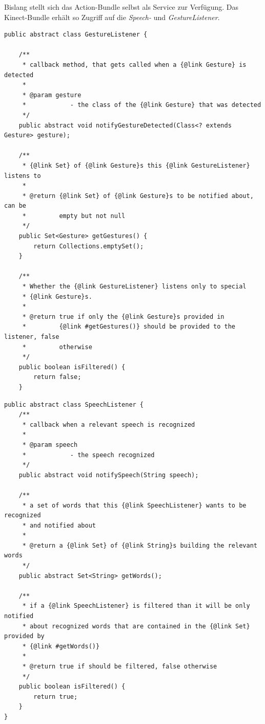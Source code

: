 Bislang stellt sich das Action-Bundle selbst als Service zur Verf\"ugung. Das Kinect-Bundle erh\"alt so Zugriff auf die \textit{Speech-} und 
\textit{GestureListener}.


\par\smallskip
\lstset{language=Java}
\begin{lstlisting}[caption={Klasse GestureListener}, label={listing:GestureListener}]
public abstract class GestureListener {

	/**
	 * callback method, that gets called when a {@link Gesture} is detected
	 * 
	 * @param gesture
	 *            - the class of the {@link Gesture} that was detected
	 */
	public abstract void notifyGestureDetected(Class<? extends Gesture> gesture);

	/**
	 * {@link Set} of {@link Gesture}s this {@link GestureListener} listens to
	 * 
	 * @return {@link Set} of {@link Gesture}s to be notified about, can be
	 *         empty but not null
	 */
	public Set<Gesture> getGestures() {
		return Collections.emptySet();
	}

	/**
	 * Whether the {@link GestureListener} listens only to special
	 * {@link Gesture}s.
	 * 
	 * @return true if only the {@link Gesture}s provided in
	 *         {@link #getGestures()} should be provided to the listener, false
	 *         otherwise
	 */
	public boolean isFiltered() {
		return false;
	}
\end{lstlisting}
\par\smallskip

\par\smallskip
\lstset{language=Java}
\begin{lstlisting}[caption={Klasse SpeechListener}, label={listing:SpeechListener}]
public abstract class SpeechListener {
	/**
	 * callback when a relevant speech is recognized
	 * 
	 * @param speech
	 *            - the speech recognized
	 */
	public abstract void notifySpeech(String speech);

	/**
	 * a set of words that this {@link SpeechListener} wants to be recognized
	 * and notified about
	 * 
	 * @return a {@link Set} of {@link String}s building the relevant words
	 */
	public abstract Set<String> getWords();

	/**
	 * if a {@link SpeechListener} is filtered than it will be only notified
	 * about recognized words that are contained in the {@link Set} provided by
	 * {@link #getWords()}
	 * 
	 * @return true if should be filtered, false otherwise
	 */
	public boolean isFiltered() {
		return true;
	}
}
\end{lstlisting}
\par\smallskip

